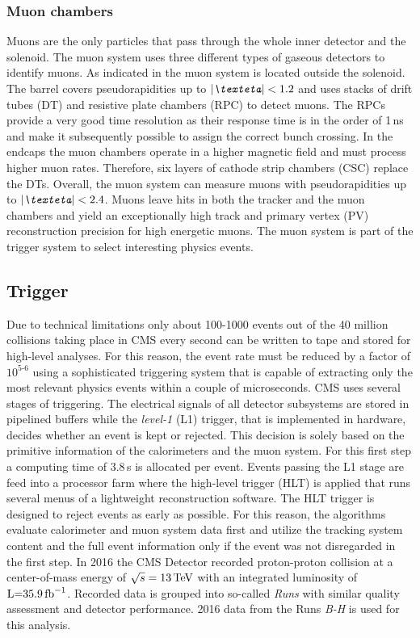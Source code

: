 \subsubsection{Muon chambers}

Muons are the only particles that pass through the whole inner detector and the solenoid.
The muon system uses three different types of gaseous detectors to identify muons. 
As indicated in  the muon system is located  outside the solenoid.
The barrel covers pseudorapidities up to $\abs{\eta}<\text{1.2}$ and uses stacks of drift tubes (DT) and resistive plate chambers (RPC) to detect muons. The RPCs 
provide a very good time resolution as their response time is in the order of 1\,ns and make it subsequently possible to assign the correct bunch crossing.
In the endcaps the muon chambers operate in a higher magnetic field and must process higher muon rates. Therefore, six layers of cathode 
strip chambers (CSC) replace the DTs.\newpage{}
Overall, the muon system can measure muons with pseudorapidities up to $\abs{\eta}<\text{2.4}$.
Muons leave hits in both the tracker and the muon chambers and yield an exceptionally high track and primary vertex (PV) reconstruction precision for high energetic muons. 
The muon system is part of the trigger system to select interesting physics events.




\subsection{Trigger}
Due to technical limitations only about 100-1000 events out of the 40 million collisions taking place in CMS every second can
be written to tape and stored for high-level analyses. For this reason, the event rate must be reduced by a factor of $\text{10}^\text{5-6}$ using a sophisticated triggering system 
that is capable of extracting only the most relevant physics events within a couple of microseconds. CMS uses several stages of triggering. The electrical signals of all detector subsystems are stored in pipelined buffers while
the \textit{level-1} (L1) trigger, that is implemented in hardware, decides whether an event is kept or rejected. This decision is solely based on the primitive information of the calorimeters and the muon system. 
For this first step a computing time of 3.8\,{\textmu s} is allocated per event.
Events passing the L1 stage are feed into a processor farm where the high-level trigger (HLT) is applied that runs several menus of 
a lightweight reconstruction software. The HLT trigger is designed to reject events as early as possible. For this reason, the 
algorithms evaluate calorimeter and muon system data first and utilize the tracking system content and the full event information
only if the event was not disregarded in the first step. \newline{}
In 2016 the CMS Detector recorded proton-proton collision at a center-of-mass energy of $\sqrt{s}=\text{13\,TeV}$ with an integrated luminosity of $\text{L=35.9\,fb}^{-1}$. Recorded data is grouped into
so-called \textit{Runs} with similar quality assessment and detector performance. 2016 data from the Runs \textit{B-H} is used for this analysis.


